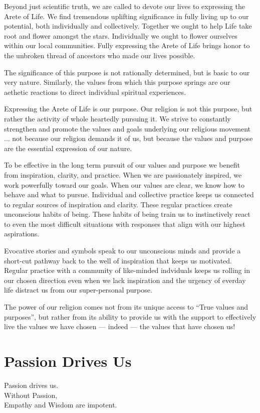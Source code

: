 \documentclass[ebook,12pt,openany,twoside]{memoir}
\newcommand{\tab}{\hspace*{2em}}
\newcommand{\imagefacingchapter}[1]{
  \cleartoverso
  \clearpage \null
  \thispagestyle{cleared}
  \AddToShipoutPictureBG*{%
    \AtStockLowerLeft{%
      \texttt{[image: \#1]}
    }
  }
  \clearpage
}
\begin{document}
Beyond just scientific truth, we are called to devote our lives to expressing
the Arete of Life. We find tremendous uplifting significance in fully living up
to our potential, both individually and collectively. Together we ought to help
Life take root and flower amongst the stars. Individually we ought to flower
ourselves within our local communities. Fully expressing the Arete of Life
brings honor to the unbroken thread of ancestors who made our lives possible.

The significance of this purpose is not rationally determined, but is basic to
our very nature. Similarly, the values from which this purpose springs are our
aethetic reactions to direct individual spiritual experiences.

Expressing the Arete of Life is our purpose. Our religion is not this purpose,
but rather the activity of whole heartedly pursuing it. We strive to constantly
strengthen and promote the values and goals underlying our religious movement
... not because our religion demands it of us, but because the values and
purpose are the essential expression of our nature.

To be effective in the long term pursuit of our values and purpose we benefit
from inspiration, clarity, and practice. When we are passionately inspired, we
work powerfully toward our goals. When our values are clear, we know how to
behave and what to pursue. Individual and collective practice keeps us
connected to regular sources of inspiration and clarity. These regular
practices create unconscious habits of being. These habits of being train us to
instinctively react to even the most difficult situations with responses that
align with our highest aspirations.

Evocative stories and symbols speak to our unconscious minds and provide a
short-cut pathway back to the well of inspiration that keeps us motivated.
Regular practice with a community of like-minded indviduals keeps us rolling in
our chosen direction even when we lack inspiration and the urgency of everday
life distract us from our super-personal purpose.

The power of our religion comes not from its unique access to ``True values and
purposes'', but rather from its ability to provide us with the support to
effectively live the values we have chosen --- indeed --- the values that
have chosen us!


\imagefacingchapter{images/Elephant}
\chapter{Passion Drives Us}
\setlength\epigraphwidth{2.8in}
\epigraph{
  Passion drives us.\\
  Without Passion,\\
  \tab Empathy and Wisdom are impotent.
}{}
\end{document}
